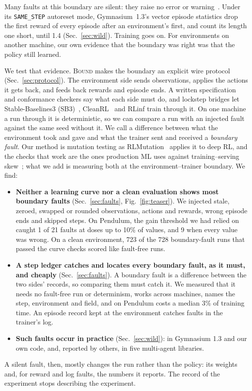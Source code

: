 \documentclass[conference]{IEEEtran}
\newcommand{\sys}{\textsc{Bound}}
\newcommand{\sys}{PlugRL}
\begin{document}
Many faults at this boundary are silent: they raise no error or
warning~\cite{tambon2024silent}. Under its \texttt{SAME\_STEP}
autoreset mode, Gymnasium~1.3's vector episode statistics drop the first
reward of every episode after an environment's first, and count its length
one short, until 1.4 (Sec.~\ref{sec:wild}). Training goes on. For environments on
another machine, our own evidence that the boundary was right was
that the policy still learned.

We test that evidence. \sys{} makes the boundary an explicit wire protocol
(Sec.~\ref{sec:protocol}). The environment side sends observations, applies
the actions it gets back, and feeds back rewards and episode ends. A
written specification and conformance checkers say what each side must do,
and lockstep bridges let Stable-Baselines3 (SB3)~\cite{raffin2021sb3},
CleanRL~\cite{huang2022cleanrl} and RLinf train through it. On one machine
a run through it is deterministic, so we can compare a run with an injected
fault against the same seed without it. We call a difference between what
the environment took and gave and what the trainer sent and received a
\emph{boundary fault}. Our method is mutation testing as
RLMutation~\cite{tambon2023rlmutation} applies it to deep RL, and the checks
that work are the ones production ML uses against training--serving
skew~\cite{breck2019datavalidation}; what we add is measuring both at the
environment--trainer boundary. We find:

\begin{itemize}
\item \textbf{Neither a learning curve nor a clean evaluation shows most
  boundary faults} (Sec.~\ref{sec:faults}, Fig.~\ref{fig:teaser}). We
  injected stale, zeroed, swapped or rounded observations, actions and
  rewards, wrong episode ends and skipped steps. On Pendulum, the gain
  threshold we had relied on caught 1 of 21 faults at doses up to 10\%
  of values, and 9 when every value was wrong. On a clean environment, 723
  of the 728 boundary-fault runs that passed the curve checks scored like
  fault-free runs.
\item \textbf{A step ledger catches and locates every boundary fault, as it
  must, and cheaply} (Sec.~\ref{sec:faults}). A boundary fault is a
  difference between the two sides' records, so comparing them must catch
  it. We measured that it needs no fault-free run or determinism,
  works across machines, names the step, environment and
  field, and on Pendulum costs a median 3\% of training time. An episode record kept at the
  environment catches faults in the trainer's log.
\item \textbf{Such faults occur in practice} (Sec.~\ref{sec:wild}): in
  Gymnasium 1.3 and our own code, and, reported by others, in five
  multi-agent libraries.
\end{itemize}
A silent fault, then, mostly changes the run rather than the policy: its weights
and, for reward and log faults, the numbers it reports. The record of the
experiment stops describing the experiment.
\end{document}
